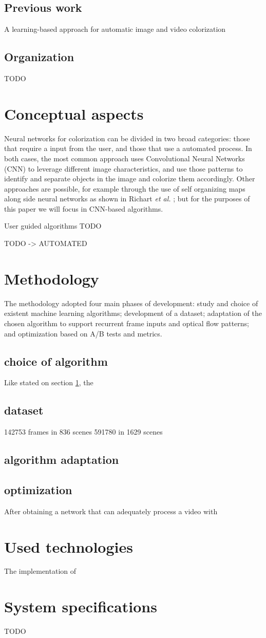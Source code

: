 \documentclass[12pt,openright,twoside,a4paper,brazil]{abntex2}
\begin{document}
\subsection{Previous work}
A learning-based approach for automatic image and video colorization

\subsection{Organization}
TODO

\section{Conceptual aspects} \label{sec:Concept}
Neural networks for colorization can be divided in two broad categories: those that require a input from the user, and those that use a automated process. In both cases, the most common approach uses Convolutional Neural Networks (CNN) to leverage different image characteristics, and use those patterns to identify and separate objects in the image and colorize them accordingly. Other approaches are possible, for example through the use of self organizing maps along side neural networks as shown in Richart \textit{et al.} \cite{Richart_som_nn}; but for the purposes of this paper we will focus in CNN-based algorithms.

User guided algorithms TODO

TODO -> AUTOMATED

\section{Methodology}
The methodology adopted four main phases of development: study and choice of existent machine learning algorithms; development of a dataset; adaptation of the chosen algorithm to support recurrent frame inputs and optical flow patterns; and optimization based on A/B tests and metrics.

\subsection{choice of algorithm}
Like stated on section \ref{sec:Concept}, the

\subsection{dataset}
142753 frames in 836 scenes
591780 in 1629 scenes


\subsection{algorithm adaptation}

\subsection{optimization}
After obtaining a network that can adequately process a video with

\section{Used technologies}
The implementation of

\section{System specifications}
TODO


\end{document}

